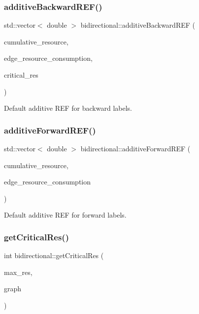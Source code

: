\subsubsection{\texorpdfstring{additive\+Backward\+R\+E\+F()}{additiveBackwardREF()}}
{\footnotesize\ttfamily std\+::vector$<$ double $>$ bidirectional\+::additive\+Backward\+R\+EF (\begin{DoxyParamCaption}\item[{const std\+::vector$<$ double $>$ \&}]{cumulative\+\_\+resource,  }\item[{const std\+::vector$<$ double $>$ \&}]{edge\+\_\+resource\+\_\+consumption,  }\item[{const int \&}]{critical\+\_\+res }\end{DoxyParamCaption})}



Default additive R\+EF for backward labels. 

\mbox{\label{namespacebidirectional_a6b3d052fd58c8158b4e7a79acbed3c0e}} 
\subsubsection{\texorpdfstring{additive\+Forward\+R\+E\+F()}{additiveForwardREF()}}
{\footnotesize\ttfamily std\+::vector$<$ double $>$ bidirectional\+::additive\+Forward\+R\+EF (\begin{DoxyParamCaption}\item[{const std\+::vector$<$ double $>$ \&}]{cumulative\+\_\+resource,  }\item[{const std\+::vector$<$ double $>$ \&}]{edge\+\_\+resource\+\_\+consumption }\end{DoxyParamCaption})}



Default additive R\+EF for forward labels. 

\mbox{\label{namespacebidirectional_a7b92b2282139801a9e2668a743ad07a1}} 
\subsubsection{\texorpdfstring{get\+Critical\+Res()}{getCriticalRes()}}
{\footnotesize\ttfamily int bidirectional\+::get\+Critical\+Res (\begin{DoxyParamCaption}\item[{const std\+::vector$<$ double $>$ \&}]{max\+\_\+res,  }\item[{const \hyperlink{classbidirectional_1_1DiGraph}{Di\+Graph} \&}]{graph }\end{DoxyParamCaption})}

